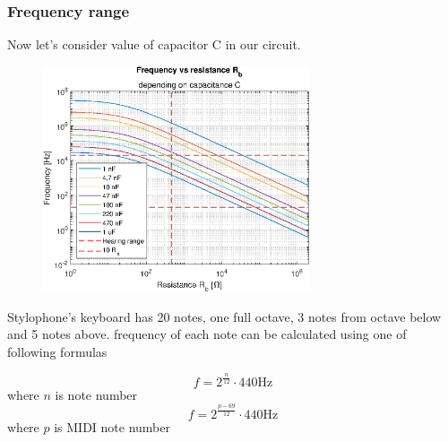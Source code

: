 \documentclass[english,10pt,a4paper]{article}
\begin{document}
	\subsubsection{Frequency range}
	Now let's consider value of capacitor C in our circuit. 
	
	\begin{figure}[H]
		\centering
		\includegraphics[width=0.7\textwidth]{img/fr_plot.eps}
	\end{figure}
	
	Stylophone's keyboard has 20 notes, one full octave, 3 notes from octave below and 5 notes above. frequency of each note can be calculated using one of following formulas
	
	\begin{equation}
		f = 2^{\frac{n}{12}} \cdot 440 \text{Hz}
	\end{equation}
	where $n$ is note number
	\begin{equation}
		f = 2^{\frac{p-69}{12}}  \cdot 440 \text{Hz}
	\end{equation}
	where $p$ is MIDI note number
	
	
	
\end{document}
